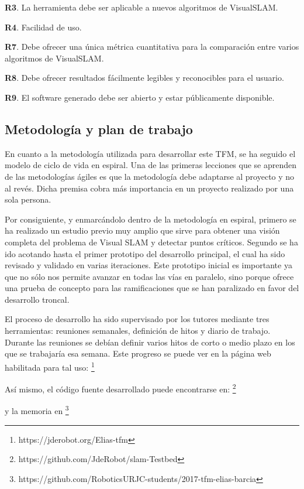 	\textbf{R3}. La herramienta debe ser aplicable a nuevos algoritmos de VisualSLAM.

	\textbf{R4}. Facilidad de uso.

	\textbf{R7}. Debe ofrecer una única métrica cuantitativa para la comparación entre varios algoritmos de VisualSLAM.

	\textbf{R8}. Debe ofrecer resultados fácilmente legibles y reconocibles para el usuario.

	\textbf{R9}. El software generado debe ser abierto y estar públicamente disponible.

\subsection{Metodología y plan de trabajo}

En cuanto a la metodología utilizada para desarrollar este TFM, se ha seguido el modelo de ciclo de vida en espiral. Una de las primeras lecciones que se aprenden de las metodologías ágiles es que la metodología debe adaptarse al proyecto y no al revés. Dicha premisa cobra más importancia en un proyecto realizado por una sola persona.

Por consiguiente, y enmarcándolo dentro de la metodología en espiral, primero se ha realizado un estudio previo muy amplio que sirve para obtener una visión completa del problema de Visual SLAM y detectar puntos críticos. Segundo se ha ido acotando hasta el primer prototipo del desarrollo principal, el cual ha sido revisado y validado en varias iteraciones. Este prototipo inicial es importante ya que no sólo nos permite avanzar en todas las vías en paralelo, sino porque ofrece una prueba de concepto para las ramificaciones que se han paralizado en favor del desarrollo troncal.

El proceso de desarrollo ha sido supervisado por los tutores mediante tres herramientas: reuniones semanales, definición de hitos y diario de trabajo.
Durante las reuniones se debían definir varios hitos de corto o medio plazo en los que se trabajaría esa semana. Este progreso se puede ver en la página web habilitada para tal uso:
\footnote{https://jderobot.org/Elias-tfm}

Así mismo, el código fuente desarrollado puede encontrarse en:
\footnote{https://github.com/JdeRobot/slam-Testbed}

y la memoria en 
\footnote{https://github.com/RoboticsURJC-students/2017-tfm-elias-barcia}

\clearpage
\newpage
\pagebreak


